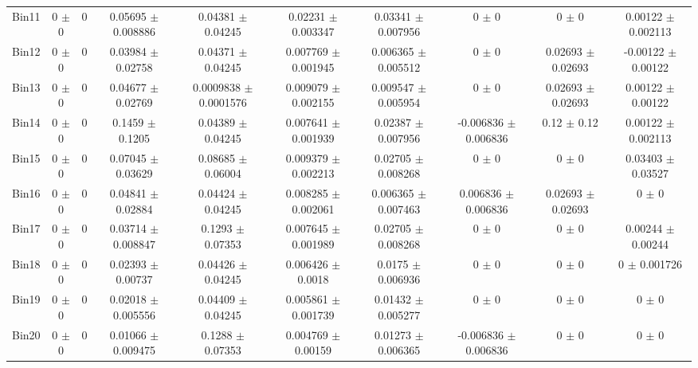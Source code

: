 \begin{tabular}{@{\extracolsep{4pt}}lccccccccc@{}}
     Bin11 & 0 $\pm$ 0 & 0 & 0.05695 $\pm$ 0.008886 & 0.04381 $\pm$ 0.04245 & 0.02231 $\pm$ 0.003347 & 0.03341 $\pm$ 0.007956 & 0 $\pm$ 0 & 0 $\pm$ 0 & 0.00122 $\pm$ 0.002113 \\ 
     Bin12 & 0 $\pm$ 0 & 0 & 0.03984 $\pm$ 0.02758 & 0.04371 $\pm$ 0.04245 & 0.007769 $\pm$ 0.001945 & 0.006365 $\pm$ 0.005512 & 0 $\pm$ 0 & 0.02693 $\pm$ 0.02693 & -0.00122 $\pm$ 0.00122 \\ 
     Bin13 & 0 $\pm$ 0 & 0 & 0.04677 $\pm$ 0.02769 & 0.0009838 $\pm$ 0.0001576 & 0.009079 $\pm$ 0.002155 & 0.009547 $\pm$ 0.005954 & 0 $\pm$ 0 & 0.02693 $\pm$ 0.02693 & 0.00122 $\pm$ 0.00122 \\ 
     Bin14 & 0 $\pm$ 0 & 0 & 0.1459 $\pm$ 0.1205 & 0.04389 $\pm$ 0.04245 & 0.007641 $\pm$ 0.001939 & 0.02387 $\pm$ 0.007956 & -0.006836 $\pm$ 0.006836 & 0.12 $\pm$ 0.12 & 0.00122 $\pm$ 0.002113 \\ 
     Bin15 & 0 $\pm$ 0 & 0 & 0.07045 $\pm$ 0.03629 & 0.08685 $\pm$ 0.06004 & 0.009379 $\pm$ 0.002213 & 0.02705 $\pm$ 0.008268 & 0 $\pm$ 0 & 0 $\pm$ 0 & 0.03403 $\pm$ 0.03527 \\ 
     Bin16 & 0 $\pm$ 0 & 0 & 0.04841 $\pm$ 0.02884 & 0.04424 $\pm$ 0.04245 & 0.008285 $\pm$ 0.002061 & 0.006365 $\pm$ 0.007463 & 0.006836 $\pm$ 0.006836 & 0.02693 $\pm$ 0.02693 & 0 $\pm$ 0 \\ 
     Bin17 & 0 $\pm$ 0 & 0 & 0.03714 $\pm$ 0.008847 & 0.1293 $\pm$ 0.07353 & 0.007645 $\pm$ 0.001989 & 0.02705 $\pm$ 0.008268 & 0 $\pm$ 0 & 0 $\pm$ 0 & 0.00244 $\pm$ 0.00244 \\ 
     Bin18 & 0 $\pm$ 0 & 0 & 0.02393 $\pm$ 0.00737 & 0.04426 $\pm$ 0.04245 & 0.006426 $\pm$ 0.0018 & 0.0175 $\pm$ 0.006936 & 0 $\pm$ 0 & 0 $\pm$ 0 & 0 $\pm$ 0.001726 \\ 
     Bin19 & 0 $\pm$ 0 & 0 & 0.02018 $\pm$ 0.005556 & 0.04409 $\pm$ 0.04245 & 0.005861 $\pm$ 0.001739 & 0.01432 $\pm$ 0.005277 & 0 $\pm$ 0 & 0 $\pm$ 0 & 0 $\pm$ 0 \\ 
     Bin20 & 0 $\pm$ 0 & 0 & 0.01066 $\pm$ 0.009475 & 0.1288 $\pm$ 0.07353 & 0.004769 $\pm$ 0.00159 & 0.01273 $\pm$ 0.006365 & -0.006836 $\pm$ 0.006836 & 0 $\pm$ 0 & 0 $\pm$ 0 \\ 
\hline\hline
  \end{tabular}
